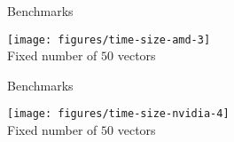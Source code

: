 \begin{frame}{Benchmarks}
 \begin{center}
   \centering \texttt{[image: figures/time-size-amd-3]} \\[1em]
   \hspace*{1cm} Fixed number of $50$ vectors
 \end{center}
\end{frame}

\begin{frame}{Benchmarks}
 \begin{center}
   \centering \texttt{[image: figures/time-size-nvidia-4]} \\[1em]
   \hspace*{1cm} Fixed number of $50$ vectors
 \end{center}
\end{frame}


